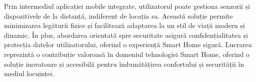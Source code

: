 Prin intermediul aplicației mobile integrate, utilizatorul poate gestiona senzorii și dispozitivele de la distanță, indiferent de locația sa. Această soluție permite minimizarea legăturii fizice și facilitează adaptarea la un stil de viață modern și dinamic. În plus, abordarea orientată spre securitate asigură confidențialitatea și protecția datelor utilizatorului, oferind o experiență Smart Home sigură. Lucrarea reprezintă o contribuție valoroasă în domeniul tehnologiei Smart Home, oferind o soluție inovatoare și accesibilă pentru îmbunătățirea confortului și securității în mediul locuinței.

%
